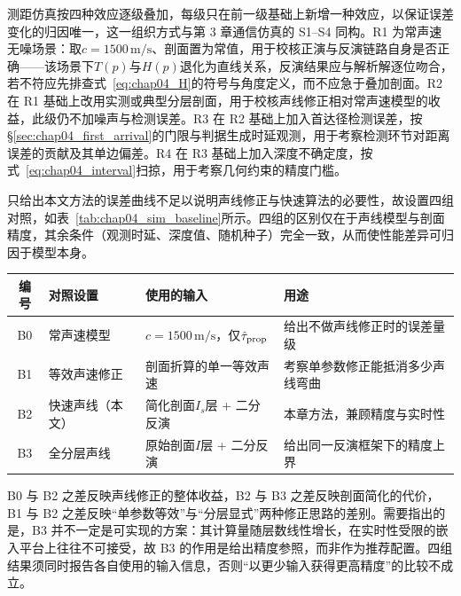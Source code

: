 测距仿真按四种效应逐级叠加，每级只在前一级基础上新增一种效应，以保证误差变化的归因唯一，这一组织方式与第 3 章通信仿真的 S1--S4 同构。R1 为常声速无噪场景：取$c=1500\,\mathrm{m/s}$、剖面置为常值，用于校核正演与反演链路自身是否正确——该场景下$T(p)$与$H(p)$退化为直线关系，反演结果应与解析解逐位吻合，若不符应先排查式~\eqref{eq:chap04_H}的符号与角度定义，而不应急于叠加剖面。R2 在 R1 基础上改用实测或典型分层剖面，用于校核声线修正相对常声速模型的收益，此级仍不加噪声与检测误差。R3 在 R2 基础上加入首达径检测误差，按\S\ref{sec:chap04_first_arrival}的门限与判据生成时延观测，用于考察检测环节对距离误差的贡献及其单边偏差。R4 在 R3 基础上加入深度不确定度，按式~\eqref{eq:chap04_interval}扫掠，用于考察几何约束的精度门槛。

只给出本文方法的误差曲线不足以说明声线修正与快速算法的必要性，故设置四组对照，如表~\ref{tab:chap04_sim_baseline}所示。四组的区别仅在于声线模型与剖面精度，其余条件（观测时延、深度值、随机种子）完全一致，从而使性能差异可归因于模型本身。

\begin{table}[htbp]
 \vspace{0.5em}\centering\wuhao
 \begin{tabularx}{\linewidth}{@{}c l l X@{}}
 \toprule[1.5pt]
 编号 & 对照设置 & 使用的输入 & 用途\\
 \midrule[1pt]
 B0 & 常声速模型 & $c=1500\,\mathrm{m/s}$，仅$\hat{\tau}_{\rm prop}$ & 给出不做声线修正时的误差量级\\
 B1 & 等效声速修正 & 剖面折算的单一等效声速 & 考察单参数修正能抵消多少声线弯曲\\
 B2 & 快速声线（本文） & 简化剖面$I_s$层 + 二分反演 & 本章方法，兼顾精度与实时性\\
 B3 & 全分层声线 & 原始剖面$I$层 + 二分反演 & 给出同一反演框架下的精度上界\\
 \bottomrule[1.5pt]
 \end{tabularx}
\end{table}

B0 与 B2 之差反映声线修正的整体收益，B2 与 B3 之差反映剖面简化的代价，B1 与 B2 之差反映“单参数等效”与“分层显式”两种修正思路的差别。需要指出的是，B3 并不一定是可实现的方案：其计算量随层数线性增长，在实时性受限的嵌入平台上往往不可接受，故 B3 的作用是给出精度参照，而非作为推荐配置。四组结果须同时报告各自使用的输入信息，否则“以更少输入获得更高精度”的比较不成立。

